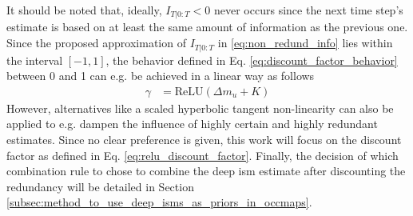 It should be noted that, ideally, $I_{T|0:T} < 0$ never occurs since the next time step's estimate is based on at least the same amount of information as the previous one. Since the proposed approximation of $I_{T|0:T}$ in \eqref{eq:non_redund_info} lies within the interval $[-1,1]$, the behavior defined in Eq. \ref{eq:discount_factor_behavior} between 0 and 1 can e.g. be achieved in a linear way as follows
\begin{align}
	\label{eq:relu_discount_factor}
	\gamma &= \mathrm{ReLU}(\Delta m_u + K)
\end{align}
However, alternatives like a scaled hyperbolic tangent non-linearity can also be applied to e.g. dampen the influence of highly certain and highly redundant estimates. Since no clear preference is given, this work will focus on the discount factor as defined in Eq. \ref{eq:relu_discount_factor}. Finally, the decision of which combination rule to chose to combine the deep \gls{ism} estimate after discounting the redundancy will be detailed in Section \ref{subsec:method_to_use_deep_isms_as_priors_in_occmaps}.
%
